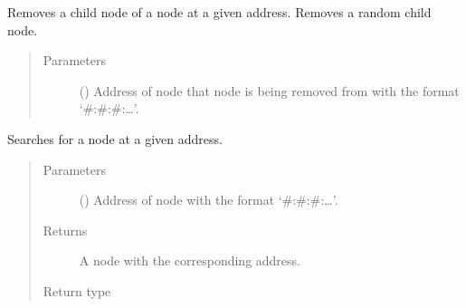\documentclass[letterpaper,10pt,english]{sphinxmanual}
\begin{document}
\begin{fulllineitems}
\begin{fulllineitems}
\end{fulllineitems}


\begin{fulllineitems}
\label{\detokenize{index:ThresTree.ThresTree.removeChild}}
Removes a child node of a node at a given address. Removes a random child node.
\begin{quote}\begin{description}
\item[{Parameters}] \leavevmode
{} () \textendash{} Address of node that node is being removed from with the format ‘\#:\#:\#:…’.

\end{description}\end{quote}

\end{fulllineitems}


\begin{fulllineitems}
\label{\detokenize{index:ThresTree.ThresTree.search}}
Searches for a node at a given address.
\begin{quote}\begin{description}
\item[{Parameters}] \leavevmode
{} () \textendash{} Address of node with the format ‘\#:\#:\#:…’.

\item[{Returns}] \leavevmode
A node with the corresponding address.

\item[{Return type}] \leavevmode
{\hyperref[\detokenize{index:ThresTree.TreeNode}]{}}

\end{description}\end{quote}

\end{fulllineitems}


\end{fulllineitems}

\end{document}

